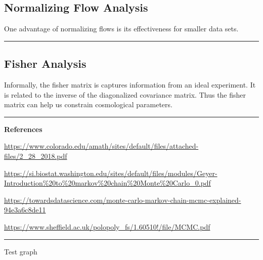 \subsection{Normalizing Flow Analysis}
One advantage of normalizing flows is its effectiveness for smaller data sets. 

\bigskip
\hrule
\subsection{Fisher Analysis}
Informally, the fisher matrix is captures information from an ideal experiment. It is related to the inverse of the diagonalized covariance matrix.  Thus the fisher matrix can help us constrain cosmological parameters.

\bigskip
\hrule
\textbf{\large References}

\url{https://www.colorado.edu/amath/sites/default/files/attached-files/2_28_2018.pdf}

\url{https://si.biostat.washington.edu/sites/default/files/modules/Geyer-Introduction\%20to\%20markov\%20chain\%20Monte\%20Carlo_0.pdf}

\url{https://towardsdatascience.com/monte-carlo-markov-chain-mcmc-explained-94e3a6c8de11}

\url{https://www.sheffield.ac.uk/polopoly_fs/1.60510!/file/MCMC.pdf}
\hrule

Test graph

